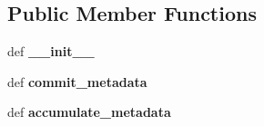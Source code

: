 \subsection*{Public Member Functions}
\begin{DoxyCompactItemize}
\item 
\hypertarget{classcheshire3_1_1base_store_1_1_summary_object_a55aebb0b0a89c8b0f3c11e828f04183c}{def {\bfseries \-\_\-\-\_\-init\-\_\-\-\_\-}}\label{classcheshire3_1_1base_store_1_1_summary_object_a55aebb0b0a89c8b0f3c11e828f04183c}

\item 
\hypertarget{classcheshire3_1_1base_store_1_1_summary_object_afb2ab14e8c08131d294faa67aa2853cd}{def {\bfseries commit\-\_\-metadata}}\label{classcheshire3_1_1base_store_1_1_summary_object_afb2ab14e8c08131d294faa67aa2853cd}

\item 
\hypertarget{classcheshire3_1_1base_store_1_1_summary_object_afea9e097df6f52ef5d8912a3a5e99cc5}{def {\bfseries accumulate\-\_\-metadata}}\label{classcheshire3_1_1base_store_1_1_summary_object_afea9e097df6f52ef5d8912a3a5e99cc5}

\end{DoxyCompactItemize}
